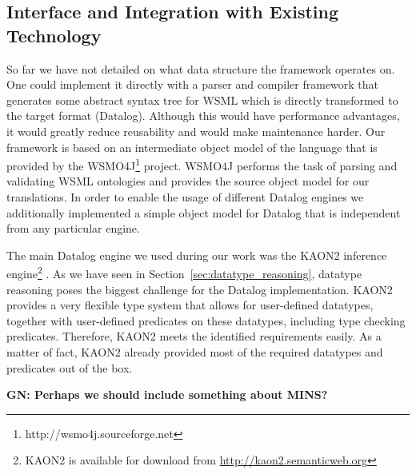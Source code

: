 \subsection{Interface and Integration with Existing Technology}
So far we have not detailed on what data structure the framework
operates on. One could implement it directly with a parser and
compiler framework that generates some abstract syntax tree for WSML
which is directly transformed to the target format (Datalog).
Although this would have performance advantages, it would greatly
reduce reusability and would make maintenance harder. Our framework is
based on an intermediate object model of the language that is
provided by the WSMO4J\footnote{http://wsmo4j.sourceforge.net}
project. WSMO4J performs the task of parsing and validating WSML ontologies and provides the source object model for our translations. In order to enable the usage of different Datalog
engines we additionally implemented a simple object model for
Datalog that is independent from any particular
engine.

The main Datalog engine we used during our work was the KAON2
inference engine\footnote{KAON2 is available for download from
\url{http://kaon2.semanticweb.org}} \cite{hustadt04reducing}. As we have seen in Section~\ref{sec:datatype_reasoning}, datatype reasoning poses the biggest challenge for the Datalog implementation.
KAON2 provides a very flexible type system that allows for
user-defined datatypes, together with user-defined predicates on
these datatypes, including type checking predicates. Therefore,
KAON2 meets the identified requirements easily. As a matter of
fact, KAON2 already provided most of the required datatypes and
predicates out of the box.

{\bf GN: Perhaps we should include something about MINS?}